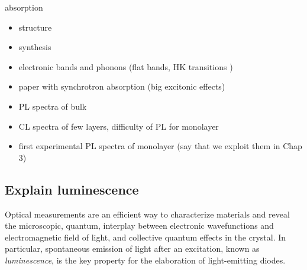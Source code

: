 absorption 




\begin{itemize}
	\item structure
	\item synthesis
	\item electronic bands and phonons (flat bands, HK transitions \cite{fugallo})
	\item paper with synchrotron absorption (big excitonic effects)
	\item PL spectra of bulk
	\item CL spectra of few layers, difficulty of PL for monolayer
	\item first experimental PL spectra of monolayer (say that we exploit them in Chap 3) 
\end{itemize}


\subsection{Explain luminescence}
Optical measurements are an efficient way to characterize materials and reveal the microscopic, quantum, interplay between electronic wavefunctions and electromagnetic field of light, and collective quantum effects in the crystal.\cite{something} In particular, spontaneous emission of light after an excitation, known as \textit{luminescence}, is the key property for the elaboration of light-emitting diodes. 

